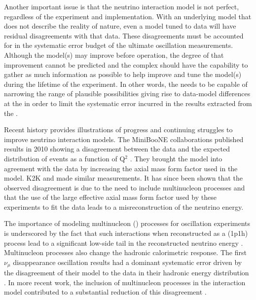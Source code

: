 Another important issue is that the neutrino interaction model is not perfect, regardless of the experiment and implementation.  With an underlying model that does not describe the reality of nature, even a model tuned to   data will have residual disagreements with that data.  These disagreements must be accounted for in the systematic error budget of the ultimate oscillation measurements.  Although the model(s) may improve before  operation, the degree of that improvement cannot be predicted and the    complex should have the capability to gather as much information as possible to help improve and tune the model(s) during the lifetime of the experiment.  In other words, the   needs to be capable of narrowing the range of plausible possibilities giving rise to data-model differences at the   in order to limit the systematic error incurred in the results extracted from the  .   

Recent history provides illustrations of progress and continuing struggles to improve neutrino interaction models.  The MiniBooNE collaborations published results in 2010 showing a disagreement between the data and the expected distribution of  events as a function of Q$^{2}$ \cite{AguilarArevalo:2010cx,Gran:2006jn}.   They brought the model into agreement with the data by increasing the axial mass form factor used in the model.  K2K \cite{Gran:2006jn} and  \cite{Adamson:2014pgc} made similar measurements.  It has since been shown that the observed disagreement is due to the need to include multinucleon processes and that the use of the large effective axial mass form factor used by these experiments to fit the data leads to a misreconstruction of the neutrino energy.  

The importance of modeling multinucleon () processes for oscillation experiments is underscored by the fact that such interactions when reconstructed as a  (1p1h) process lead to a significant low-side tail in the reconstructed neutrino energy \cite{Martini:2012uc}.  Multinucleon processes also change the hadronic calorimetric response.  The first    $\nu_{\mu}$ disappearance oscillation results had a dominant systematic error driven by the disagreement of their model to the data in their hadronic energy distribution \cite{Adamson:2016xxw}.  In more recent work, the inclusion of multinucleon processes in the interaction model contributed to a substantial reduction of this disagreement \cite{NOvA:2018gge}.

